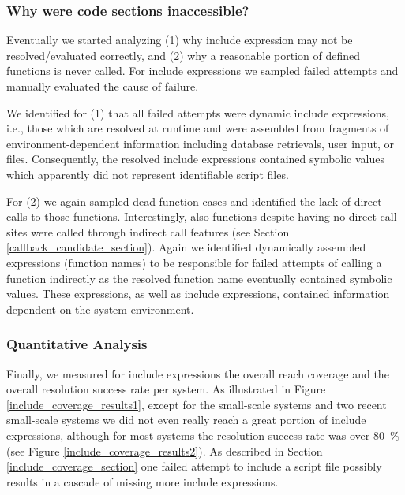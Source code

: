 \documentclass{sig-alternate-05-2015}
\begin{document}
\subsubsection{Why were code sections inaccessible?}  
Eventually we started analyzing (1) why include expression may not be resolved/evaluated correctly, and (2) why a reasonable portion of defined functions is never called. For include expressions we  sampled failed attempts and manually evaluated the cause of failure. 

We identified for (1) that all failed attempts were dynamic include expressions, i.e., those which are resolved at runtime and were assembled from fragments of environment-dependent information including database retrievals, user input, or files. Consequently, the resolved include expressions contained symbolic values which apparently did not represent identifiable script files.

For (2) we again sampled dead function cases and identified the lack of direct calls to those functions. Interestingly, also functions despite having no direct call sites were called through indirect call features (see Section \ref{callback_candidate_section}). Again we identified dynamically assembled expressions (function names) to be responsible for failed attempts of calling a function indirectly as the resolved function name eventually contained symbolic values. These expressions, as well as include expressions, contained information dependent on the system environment.

\subsubsection{Quantitative Analysis}
Finally, we measured for include expressions the overall reach coverage and the overall resolution success rate per system. As illustrated in Figure \ref{include_coverage_results1}, except for the small-scale systems and two recent small-scale systems we did not even really reach a great portion of include expressions, although for most systems the resolution success rate was over 80~\% (see Figure \ref{include_coverage_results2}). As described in Section \ref{include_coverage_section} one failed attempt to include a script file possibly results in a cascade of missing more include expressions.
\end{document}
